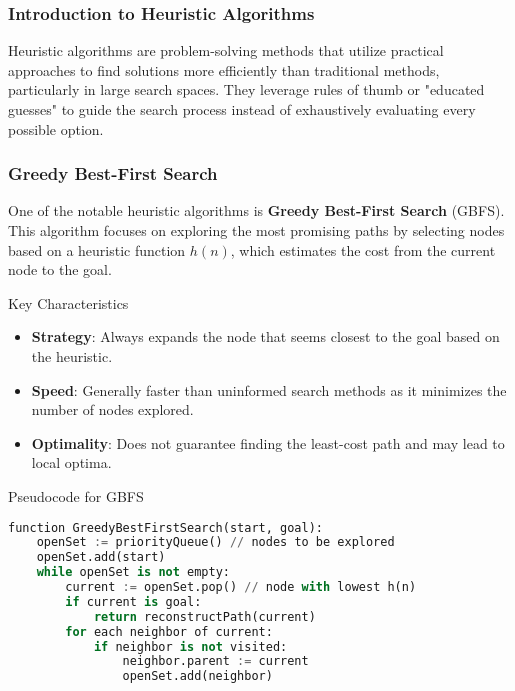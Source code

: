 \documentclass[aspectratio=169]{beamer}
\begin{document}
\begin{frame}
    \frametitle{Introduction to Heuristic Algorithms}
    Heuristic algorithms are problem-solving methods that utilize practical approaches to find solutions more efficiently than traditional methods, particularly in large search spaces. They leverage rules of thumb or "educated guesses" to guide the search process instead of exhaustively evaluating every possible option.
\end{frame}

\begin{frame}
    \frametitle{Greedy Best-First Search}
    One of the notable heuristic algorithms is \textbf{Greedy Best-First Search} (GBFS). This algorithm focuses on exploring the most promising paths by selecting nodes based on a heuristic function \( h(n) \), which estimates the cost from the current node to the goal.
    
    \begin{block}{Key Characteristics}
        \begin{itemize}
            \item \textbf{Strategy}: Always expands the node that seems closest to the goal based on the heuristic.
            \item \textbf{Speed}: Generally faster than uninformed search methods as it minimizes the number of nodes explored.
            \item \textbf{Optimality}: Does not guarantee finding the least-cost path and may lead to local optima.
        \end{itemize}
    \end{block}
    
    \begin{block}{Pseudocode for GBFS}
        \begin{lstlisting}[language=Python]
function GreedyBestFirstSearch(start, goal):
    openSet := priorityQueue() // nodes to be explored
    openSet.add(start)
    while openSet is not empty:
        current := openSet.pop() // node with lowest h(n)
        if current is goal:
            return reconstructPath(current)
        for each neighbor of current:
            if neighbor is not visited:
                neighbor.parent := current
                openSet.add(neighbor)
        \end{lstlisting}
    \end{block}
\end{frame}
\end{document}
